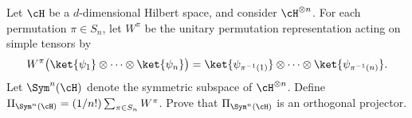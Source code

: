 Let $\cH$ be a $d$-dimensional Hilbert space, and consider $\cH^{\otimes n}$. For each permutation $\pi\in S_n$, let $W^\pi$ be the unitary permutation representation acting on simple tensors by
$$
W^\pi
\bigl(\ket{\psi_1}\otimes\cdots\otimes\ket{\psi_n}\bigr)
=
\ket{\psi_{\pi^{-1}(1)}}\otimes\cdots\otimes\ket{\psi_{\pi^{-1}(n)}}.
$$
Let $\Sym^n(\cH)$ denote the symmetric subspace of $\cH^{\otimes n}$.
Define $\Pi_{\Sym^n(\cH)}=(1/n!)\sum_{\pi\in S_n}W^\pi$.
Prove that $\Pi_{\Sym^n(\cH)}$ is an orthogonal projector.
